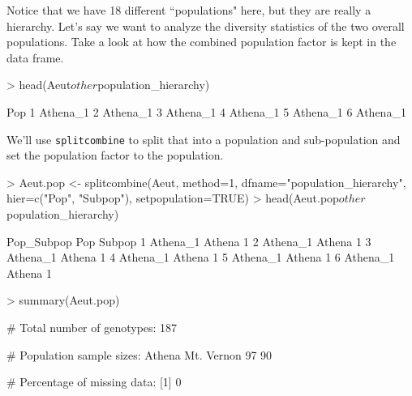 \documentclass[letterpaper]{article}
\begin{document}
Notice that we have 18 different ``populations" here, but they are really a hierarchy. Let's say we want to analyze the diversity statistics of the two overall populations. Take a look at how the combined population factor is kept in the data frame.
\begin{Schunk}
\begin{Sinput}
> head(Aeut$other$population_hierarchy)
\end{Sinput}
\begin{Soutput}
       Pop
1 Athena_1
2 Athena_1
3 Athena_1
4 Athena_1
5 Athena_1
6 Athena_1
\end{Soutput}
\end{Schunk}
We'll use \texttt{splitcombine} to split that into a population and sub-population and set the population factor to the population.
\begin{center}
\end{center}
\begin{Schunk}
\begin{Sinput}
> Aeut.pop <- splitcombine(Aeut, method=1, dfname="population_hierarchy", hier=c("Pop", "Subpop"), setpopulation=TRUE)
> head(Aeut.pop$other$population_hierarchy)
\end{Sinput}
\begin{Soutput}
  Pop_Subpop    Pop Subpop
1   Athena_1 Athena      1
2   Athena_1 Athena      1
3   Athena_1 Athena      1
4   Athena_1 Athena      1
5   Athena_1 Athena      1
6   Athena_1 Athena      1
\end{Soutput}
\begin{Sinput}
> summary(Aeut.pop)
\end{Sinput}
\begin{Soutput}
 # Total number of genotypes:  187 

 # Population sample sizes:  
    Athena Mt. Vernon 
        97         90 

 # Percentage of missing data:  
[1] 0
\end{Soutput}
\end{Schunk}
\end{document}
